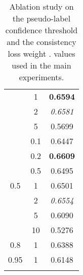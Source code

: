 \begin{table*}[t]
\begin{minipage}{.3\textwidth}
{\begin{tabular}{ccc}
        & 1 & \textbf{0.6594}\\
        & 2 & \textit{0.6581} \\
        & 5 & 0.5699\\
        \midrule
        \multirow{7}{*}{0.5} & 0.1 & 0.6447\\
          & 0.2 & \textbf{0.6609}\\
         & 0.5 & 0.6495\\
         & 1 & 0.6501\\
          & 2 & \textit{0.6554}\\
         & 5 & 0.6090\\
          & 10 & 0.5276\\
         \midrule
         0.8 & 1 & 0.6388\\
         \midrule
         0.95 & 1 & 0.6148\\
         \bottomrule \\
    \end{tabular}
    }
    \vspace{-10pt}
    \caption{\scriptsize{Ablation study on the pseudo-label confidence threshold  and the consistency loss weight . values used in the main experiments.}}
    \label{tab:conf_threshold_weight_ablation}
    \end{minipage}
\end{table*}




